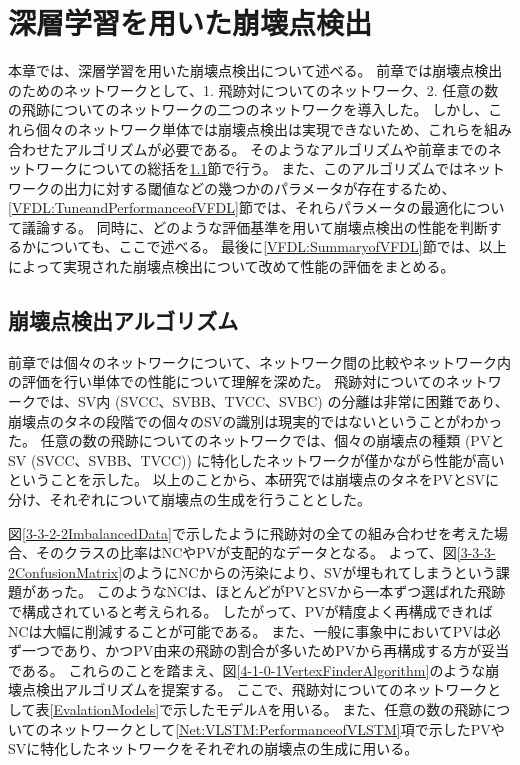 
\chapter{深層学習を用いた崩壊点検出} \label{chap:VertexFinderwithDL}

本章では、深層学習を用いた崩壊点検出について述べる。
前章では崩壊点検出のためのネットワークとして、1. 飛跡対についてのネットワーク、2. 任意の数の飛跡についてのネットワークの二つのネットワークを導入した。
しかし、これら個々のネットワーク単体では崩壊点検出は実現できないため、これらを組み合わせたアルゴリズムが必要である。
そのようなアルゴリズムや前章までのネットワークについての総括を\ref{VFDL:AlgorithmofVFDL}節で行う。
また、このアルゴリズムではネットワークの出力に対する閾値などの幾つかのパラメータが存在するため、\ref{VFDL:TuneandPerformanceofVFDL}節では、それらパラメータの最適化について議論する。
同時に、どのような評価基準を用いて崩壊点検出の性能を判断するかについても、ここで述べる。
最後に\ref{VFDL:SummaryofVFDL}節では、以上によって実現された崩壊点検出について改めて性能の評価をまとめる。


\section{崩壊点検出アルゴリズム} \label{VFDL:AlgorithmofVFDL}

前章では個々のネットワークについて、ネットワーク間の比較やネットワーク内の評価を行い単体での性能について理解を深めた。
飛跡対についてのネットワークでは、SV内 (SVCC、SVBB、TVCC、SVBC) の分離は非常に困難であり、崩壊点のタネの段階での個々のSVの識別は現実的ではないということがわかった。
任意の数の飛跡についてのネットワークでは、個々の崩壊点の種類 (PVとSV (SVCC、SVBB、TVCC)) に特化したネットワークが僅かながら性能が高いということを示した。
以上のことから、本研究では崩壊点のタネをPVとSVに分け、それぞれについて崩壊点の生成を行うこととした。

図\ref{3-3-2-2ImbalancedData}で示したように飛跡対の全ての組み合わせを考えた場合、そのクラスの比率はNCやPVが支配的なデータとなる。
よって、図\ref{3-3-3-2ConfusionMatrix}のようにNCからの汚染により、SVが埋もれてしまうという課題があった。
このようなNCは、ほとんどがPVとSVから一本ずつ選ばれた飛跡で構成されていると考えられる。
したがって、PVが精度よく再構成できればNCは大幅に削減することが可能である。
また、一般に事象中においてPVは必ず一つであり、かつPV由来の飛跡の割合が多いためPVから再構成する方が妥当である。
これらのことを踏まえ、図\ref{4-1-0-1VertexFinderAlgorithm}のような崩壊点検出アルゴリズムを提案する。
ここで、飛跡対についてのネットワークとして表\ref{EvalationModels}で示したモデルAを用いる。
また、任意の数の飛跡についてのネットワークとして\ref{Net:VLSTM:PerformanceofVLSTM}項で示したPVやSVに特化したネットワークをそれぞれの崩壊点の生成に用いる。

